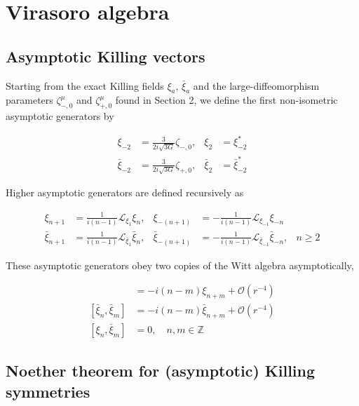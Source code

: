 \section{Virasoro algebra}\label{virasoro-algebra}

\subsection{Asymptotic Killing vectors}\label{asymptotic-killing-vectors}

Starting from the exact Killing fields \(\xi _{a}\), \(\bar{\xi}_{a}\) and the large-diffeomorphism parameters \(\zeta _{-,0}^{\mu}\) and \(\zeta _{+,0}^{\mu}\) found in Section 2, we define the first non-isometric asymptotic generators by

\begin{align}
\xi _{-2} & =\frac{3}{2i\sqrt{ 3G }}\zeta _{-,0}, & \xi _{2} & =\xi _{-2}^{*} \\
\bar{\xi}_{-2} & =\frac{3}{2i\sqrt{ 3G }}\zeta _{+,0}, & \bar{\xi}_{2} & =\bar{\xi}_{-2}^{*}
\end{align}

Higher asymptotic generators are defined recursively as

\begin{align}
\xi _{n+1} & =\frac{1}{i(n-1)}\mathcal{L}_{\xi_{1}}\xi _{n}, & \xi _{-(n+1)} & =-\frac{1}{i(n-1)}\mathcal{L}_{\xi _{-1}}\xi _{-n} \\
\bar{\xi}_{n+1} & =\frac{1}{i(n-1)}\mathcal{L}_{\bar{\xi}_{1}}\bar{\xi}_{n}, & \bar{\xi}_{-(n+1)} & =-\frac{1}{i(n-1)}\mathcal{L}_{\bar{\xi}_{-1}}\bar{\xi}_{-n}, & n\geqslant 2
\end{align}

These asymptotic generators obey two copies of the Witt algebra asymptotically,

\begin{align}
[\xi _{n},\xi _{m}] & =-i(n-m)\xi _{n+m}+\mathcal{O}(r^{-4}) \\
[\bar{\xi}_{n},\bar{\xi}_{m}] & =-i(n-m)\bar{\xi}_{n+m}+\mathcal{O}(r^{-4}) \\
[\xi _{n},\bar{\xi}_{m}] & =0,\quad n,m\in \mathbb{Z}
\end{align}

\subsection{Noether theorem for (asymptotic) Killing symmetries}\label{noether-theorem-for-asymptotic-killing-symmetries}

